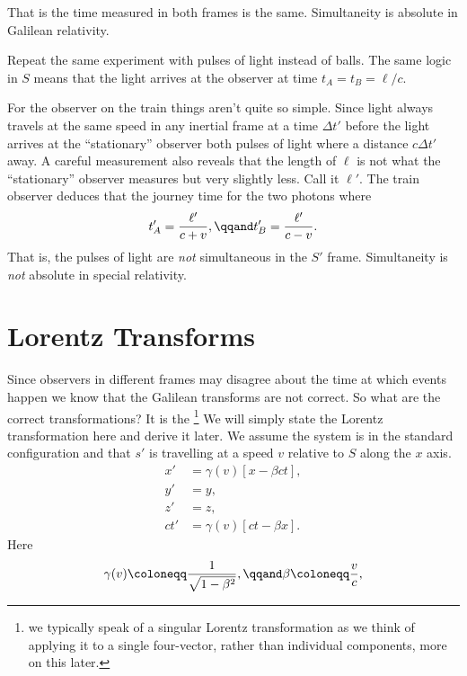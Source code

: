 \documentclass[fleqn]{NotesClass}
\begin{document}
    That is the time measured in both frames is the same.
    Simultaneity is absolute in Galilean relativity.
    
    Repeat the same experiment with pulses of light instead of balls.
    The same logic in \(S\) means that the light arrives at the observer at time \(t_A = t_B = \ell/c\).
    
    For the observer on the train things aren't quite so simple.
    Since light always travels at the same speed in any inertial frame at a time \(\Delta t'\) before the light arrives at the \enquote{stationary} observer both pulses of light where a distance \(c\Delta t'\) away.
    A careful measurement also reveals that the length of \(\ell\) is not what the \enquote{stationary} observer measures but very slightly less.
    Call it \(\ell'\).
    The train observer deduces that the journey time for the two photons where
    \begin{equation}
        t_A' = \frac{\ell'}{c + v}, \qqand t_B' = \frac{\ell'}{c - v}.
    \end{equation}
    That is, the pulses of light are \emph{not} simultaneous in the \(S'\) frame.
    Simultaneity is \emph{not} absolute in special relativity.

    \section{Lorentz Transforms}
    Since observers in different frames may disagree about the time at which events happen we know that the Galilean transforms are not correct.
    So what are the correct transformations?
    It is the \footnote{we typically speak of a singular Lorentz transformation as we think of applying it to a single four-vector, rather than individual components, more on this later.}
    We will simply state the Lorentz transformation here and derive it later.
    We assume the system is in the standard configuration and that \(s'\) is travelling at a speed \(v\) relative to \(S\) along the \(x\) axis.
    \begin{align}
        x' &= \gamma(v)[x - \beta ct],\\
        y' &= y,\\
        z' &= z,\\
        ct' &= \gamma(v)[ct - \beta x].
    \end{align}
    Here
    \begin{equation}
        \gamma(v) \coloneqq \frac{1}{\sqrt{1 - \beta^2}}, \qqand \beta \coloneqq \frac{v}{c},
    \end{equation}
\end{document}
